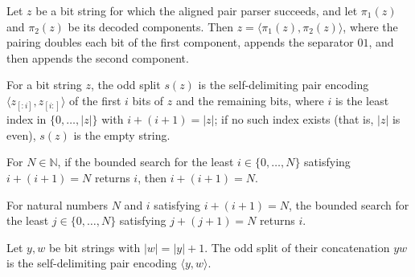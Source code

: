 \begin{lemma}
\label{Complexity.tmsat_pair_valid}
\leanok
{}
Let $z$ be a bit string for which the aligned pair parser succeeds, and let $\pi_1(z)$
and $\pi_2(z)$ be its decoded components. Then $z=\langle\pi_1(z),\pi_2(z)\rangle$,
where the pairing doubles each bit of the first component, appends the separator $01$,
and then appends the second component.
\end{lemma}

\begin{definition}
\label{Complexity.tmsatSplit}
\leanok
{}
For a bit string $z$, the odd split $s(z)$ is the self-delimiting pair encoding $\langle z_{[:i]}, z_{[i:]}\rangle$ of the first $i$ bits of $z$ and the remaining bits, where $i$ is the least index in $\{0,\dots,|z|\}$ with $i + (i+1) = |z|$; if no such index exists (that is, $|z|$ is even), $s(z)$ is the empty string.
\end{definition}

\begin{lemma}
\label{Complexity.tmsat_split_some}
\leanok
{}
For $N\in\mathbb N$, if the bounded search for the least $i\in\{0,\ldots,N\}$ satisfying
$i+(i+1)=N$ returns $i$, then $i+(i+1)=N$.
\end{lemma}

\begin{lemma}
\label{Complexity.tmsat_split_exists}
\leanok
{}
For natural numbers $N$ and $i$ satisfying $i+(i+1)=N$, the bounded search for the least
$j\in\{0,\ldots,N\}$ satisfying $j+(j+1)=N$ returns $i$.
\end{lemma}

\begin{lemma}
\label{Complexity.tmsat_split_append}
\leanok
{}
Let $y,w$ be bit strings with $|w|=|y|+1$. The odd split of their concatenation $yw$ is
the self-delimiting pair encoding $\langle y,w\rangle$.
\end{lemma}

